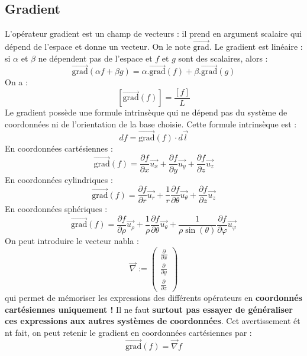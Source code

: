\documentclass[french]{book}
\theoremstyle{plain}
\theoremstyle{definition}
\theoremstyle{remark}
\newcommand{\grad}{\overrightarrow{\text{grad}}}
\begin{document}
\subsection{Gradient}
L'opérateur gradient est un champ de vecteurs : il prend en argument scalaire qui dépend de l'espace et donne un vecteur. On le note $\grad$. Le gradient est linéaire : si $\alpha$ et $\beta$ ne dépendent pas de l'espace et $f$ et $g$ sont des scalaires, alors : $$\grad(\alpha f+\beta g)=\alpha.\grad(f)+\beta.\grad(g)$$
On a : $$\left[\grad(f)\right]=\frac{[f]}{L}$$ 
Le gradient possède une formule intrinsèque qui ne dépend pas du système de coordonnées ni de l'orientation de la base choisie. Cette formule intrinsèque est : $$df=\grad(f)\cdot d\overrightarrow{l}$$ 
En coordonnées cartésiennes : $$\grad(f)=\frac{\partial f}{\partial x}\overrightarrow{u_x}+\frac{\partial f}{\partial y}\overrightarrow{u_y}+\frac{\partial f}{\partial z}\overrightarrow{u_z}$$
En coordonnées cylindriques : $$\grad(f)=\frac{\partial f}{\partial r}\overrightarrow{u_r}+\frac{1}{r}\frac{\partial f}{\partial \theta}\overrightarrow{u_\theta}+\frac{\partial f}{\partial z}\overrightarrow{u_z}$$
En coordonnées sphériques : $$\grad(f)=\frac{\partial f}{\partial \rho}\overrightarrow{u_\rho}+\frac{1}{\rho}\frac{\partial f}{\partial \theta}\overrightarrow{u_\theta}+\frac{1}{\rho\sin(\theta)}\frac{\partial f}{\partial \varphi}\overrightarrow{u_\varphi}$$
On peut introduire le vecteur nabla : $$\overrightarrow{\nabla}:=\begin{pmatrix}
	\displaystyle\frac{\partial}{\partial x} \\[3mm]
	\displaystyle\frac{\partial}{\partial y} \\[3mm]
	\displaystyle\frac{\partial}{\partial z}
\end{pmatrix}$$ qui permet de mémoriser les expressions des différents opérateurs en \textbf{coordonnés cartésiennes uniquement !} Il ne faut \textbf{surtout pas essayer de généraliser ces expressions aux autres systèmes de coordonnées}. Cet avertissement ét	nt fait, on peut retenir le gradient en coordonnées cartésiennes par : $$\grad(f)=\overrightarrow{\nabla}f$$
\end{document}
